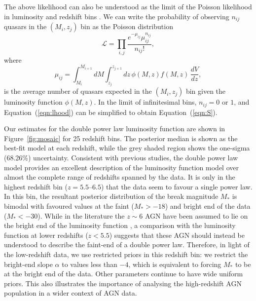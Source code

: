 \documentclass[fleqn,usenatbib]{mnras}
\begin{document}
      The above likelihood can also be understood as the limit of the
      Poisson likelihood in luminosity and redshift bins
      \citep{1983ApJ...269...35M, 2001AJ....121...54F}.  We can write the
      probability of observing $n_{ij}$ quasars in the $(M_i, z_j)$ bin as
      the Poisson distribution
      \begin{equation}
        \mathcal{L}=\prod_{i,j}\frac{e^{-\mu_{ij}}\mu_{ij}^{n_{ij}}}{n_{ij}!},
        \label{eqn:lhood}
      \end{equation}
      where 
      \begin{equation}
        \mu_{ij}= \int_{M_i}^{M_{i+1}}dM\int_{z_j}^{z_{j+1}}dz\, \phi(M,z) f(M, z)
        \,\frac{dV}{dz},
      \end{equation}
      is the average number of quasars expected in the $(M_i, z_j)$ bin
      given the luminosity function $\phi(M,z)$.  In the limit of
      infinitesimal bins, $n_{ij}=0$ or $1$, and Equation~(\ref{eqn:lhood})
      can be simplified to obtain Equation~(\ref{eqn:S}).

      Our estimates for the double power law luminosity function are shown
      in Figure~\ref{fig:mosaic} for 25 redshift bins.  The posterior median
      is shown as the best-fit model at each redshift, while the grey shaded
      region shows the one-sigma (68.26\%) uncertainty.  Consistent with
      previous studies, the double power law model provides an excellent
      description of the luminosity function model over almost the complete
      range of redshifts spanned by the data.  It is only in the highest
      redshift bin ($z=5.5$--$6.5$) that the data seem to favour a single
      power law.  In this bin, the resultant posterior distribution of the
      break magnitude $M_*$ is bimodal with favoured values at the faint
      ($M_*>-18$) and bright end of the data ($M_*<-30$).  While in the
      literature the $z\sim 6$ AGN have been assumed to lie on the bright
      end of the luminosity function \citep[e.g.,][]{2016ApJ...833..222J}, a
      comparison with the luminosity function at lower redshifts ($z<5.5$)
      suggests that these AGN should instead be understood to describe the
      faint-end of a double power law.  Therefore, in light of the
      low-redshift data, we use restricted priors in this redshift bin: we
      restrict the bright-end slope $\alpha$ to values less than $-4$, which
      is equivalent to forcing $M_*$ to be at the bright end of the data.
      Other parameters continue to have wide uniform priors.  This also
      illustrates the importance of analysing the high-redshift AGN
      population in a wider context of AGN data.
\end{document}
